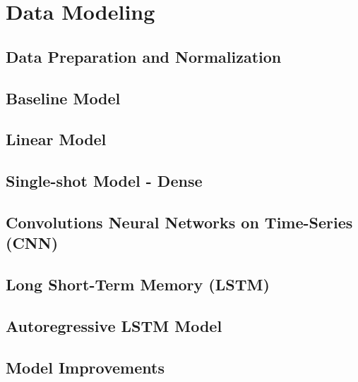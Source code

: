 % 
\section{Data Modeling}\label{sec:datamodels}


\subsection{Data Preparation and Normalization}


\subsection{Baseline Model }


\subsection{Linear Model}


\subsection{Single-shot Model - Dense}


\subsection{Convolutions Neural Networks on Time-Series (CNN)}


\subsection{Long Short-Term Memory (LSTM)}


\subsection{Autoregressive LSTM Model}


\subsection{Model Improvements}




